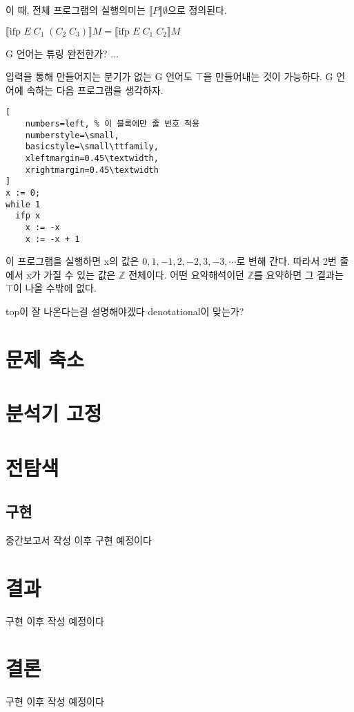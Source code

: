 \documentclass[ko]{snu-cse-bsc-thesis}
\begin{document}
이 때, 전체 프로그램의 실행의미는 $\llbracket P \rrbracket \emptyset$으로 정의된다.

$\llbracket \text{ifp } E \; C_1 \; (C_2 \; C_3) \rrbracket M = \llbracket \text{ifp } E \; C_1 \; C_2 \rrbracket M$

G 언어는 튜링 완전한가? ...

입력을 통해 만들어지는 분기가 없는 G 언어도 $\top$을 만들어내는 것이 가능하다. G 언어에 속하는 다음 프로그램을 생각하자. 

\begin{lstlisting}[
    numbers=left, % 이 블록에만 줄 번호 적용
    numberstyle=\small,
    basicstyle=\small\ttfamily,
    xleftmargin=0.45\textwidth,
    xrightmargin=0.45\textwidth
]
x := 0;
while 1
  ifp x
    x := -x
    x := -x + 1
\end{lstlisting}

이 프로그램을 실행하면 x의 값은 $0, 1, -1, 2, -2, 3, -3, \cdots$로 변해 간다. 
따라서 2번 줄에서 x가 가질 수 있는 값은 $\mathbb{Z}$ 전체이다.
어떤 요약해석이던 $\mathbb{Z}$를 요약하면 그 결과는 $\top$이 나올 수밖에 없다.


top이 잘 나온다는걸 설명해야겠다
denotational이 맞는가?

\chapter{문제 축소}\label{chap:reduce_problem}

\chapter{분석기 고정}\label{chap:fix_analyzer}


\chapter{전탐색}\label{chap:exhaustive_search}


\section{구현}\label{sec:implementation}
중간보고서 작성 이후 구현 예정이다

\chapter{결과}\label{chap:result}
구현 이후 작성 예정이다

\chapter{결론}\label{chap:conclusion}
구현 이후 작성 예정이다
\end{document}
